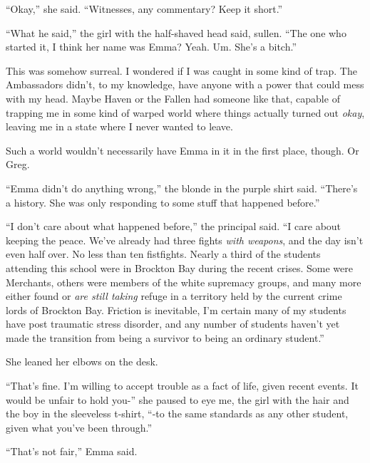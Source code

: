 ``Okay,'' she said.  ``Witnesses, any commentary?  Keep it short.''



``What he said,'' the girl with the half-shaved head said, sullen.  ``The one who started it, I think her name was Emma?  Yeah.  Um.  She's a bitch.''



This was somehow surreal.  I wondered if I was caught in some kind of trap.  The Ambassadors didn't, to my knowledge, have anyone with a power that could mess with my head.  Maybe Haven or the Fallen had someone like that, capable of trapping me in some kind of warped world where things actually turned out \emph{okay}, leaving me in a state where I never wanted to leave.



Such a world wouldn't necessarily have Emma in it in the first place, though.  Or Greg.



``Emma didn't do anything wrong,'' the blonde in the purple shirt said.  ``There's a history.  She was only responding to some stuff that happened before.''



``I don't care about what happened before,'' the principal said.  ``I care about keeping the peace.  We've already had three fights \emph{with weapons}, and the day isn't even half over.  No less than ten fistfights.  Nearly a third of the students attending this school were in Brockton Bay during the recent crises.  Some were Merchants, others were members of the white supremacy groups, and many more either found or \emph{are still taking} refuge in a territory held by the current crime lords of Brockton Bay.  Friction is inevitable, I'm certain many of my students have post traumatic stress disorder, and any number of students haven't yet made the transition from being a survivor to being an ordinary student.''



She leaned her elbows on the desk.



``That's fine.  I'm willing to accept trouble as a fact of life, given recent events.  It would be unfair to hold you-'' she paused to eye me, the girl with the hair and the boy in the sleeveless t-shirt, ``-to the same standards as any other student, given what you've been through.''



``That's not fair,'' Emma said.




